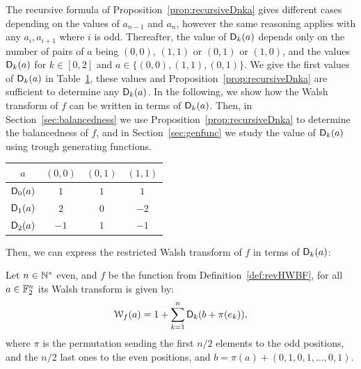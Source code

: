 \documentclass[11pt]{llncs}
\begin{document}
The recursive formula of Proposition~\ref{prop:recursiveDnka} gives different cases depending on the values of $a_{n-1}$ and $a_n$, however the same reasoning applies with any $a_i, a_{i+1}$ where $i$ is odd. 
Thereafter, the value of $\Dnka{n}{k}{a}$ depends only on the number of pairs of $a$ being $(0,0)$, $(1,1)$ or $(0,1)$ or $(1,0)$, and the values $\Dnka{2}{k}{a}$ for $k \in [0,2]$ and $a \in \{ (0,0),(1,1),(0,1)\}$. 
We give the first values of $\Dnka{2}{k}{a}$ in Table~\ref{tab:Dnka},  these values and Proposition~\ref{prop:recursiveDnka} are sufficient to determine any $\Dnka{n}{k}{a}$. 
In the following, we show how the Walsh transform of $f$ can be written in terms of $\Dnka{n}{k}{a}$. Then, in Section~\ref{sec:balancedness} we use Proposition~\ref{prop:recursiveDnka} to determine the balancedness of $f$, and in Section~\ref{sec:genfunc} we study the value of $\Dnka{n}{k}{a}$ using trough generating functions.





\begin{table}[H]
	\centering
	\begin{tabular}{|c|c|c|c|}
		\hline
		$a$ & $(0,0)$ & $(0,1)$ & $(1,1)$ \\ \hline
		$\Dnka{2}{0}{a}$ &$1$&$1$ & $1$\\ \hline
		$\Dnka{2}{1}{a}$ &$2$& $0$ & $-2$\\ \hline
		$\Dnka{2}{2}{a}$ &$-1$&$1$ & $-1$\\ \hline
	\end{tabular}
	\label{tab:Dnka}
\end{table}



Then, we can express the restricted Walsh transform of $f$ in terms of $\Dnka{n}{k}{a}$:


\begin{proposition}\label{prop:WT}
	Let $n \in \N^*$ even, and $f$ be the function from Definition~\ref{def:revHWBF}, for all $a\in \F_2^n$ its Walsh transform is given by:
	\[ \wt{f}(a)=1+\sum_{k=1}^n \Dnka{n}{k}{b+\pi(e_k)},\]
where $\pi$ is the permutation sending the first $n/2$ elements to the odd positions, and the $n/2$ last ones to the even positions, and $b=\pi(a)+(0,1,0,1,\ldots,0,1)$.
\end{proposition}
\end{document}
